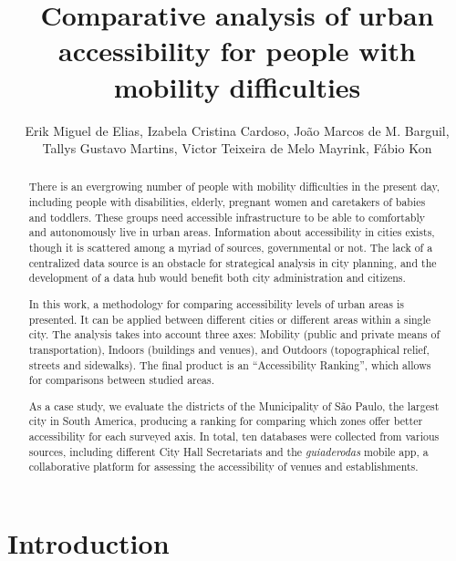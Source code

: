 \documentclass[12pt]{article}
\title{Comparative analysis of urban accessibility for people with mobility difficulties}
\author{
Erik Miguel de Elias\inst{1},
Izabela Cristina Cardoso\inst{2},
João Marcos de M. Barguil\inst{3},\\
Tallys Gustavo Martins\inst{3},
Victor Teixeira de Melo Mayrink\inst{3},
Fábio Kon\inst{3}
}
\begin{document}
\maketitle


\begin{abstract}
There is an evergrowing number of people with mobility difficulties in the present day, including
people with disabilities, elderly, pregnant women and caretakers of babies and toddlers.
These groups need accessible infrastructure to be able to comfortably and autonomously live in urban areas.
Information about accessibility in cities exists, though it is scattered among a myriad of sources, governmental or not.
The lack of a centralized data source is an obstacle for strategical analysis in city planning,
and the development of a data hub would benefit both city administration and citizens.

In this work, a methodology for comparing accessibility levels of urban areas is presented.
It can be applied between different cities or different areas within a single city.
The analysis takes into account three axes:
Mobility (public and private means of transportation),
Indoors (buildings and venues),
and Outdoors (topographical relief, streets and sidewalks).
The final product is an ``Accessibility Ranking'', which allows for comparisons between studied areas.

As a case study, we evaluate the districts of the Municipality of São Paulo, the largest city in South America,
producing a ranking for comparing which zones offer better accessibility for each surveyed axis.
In total, ten databases were collected from various sources, including different City Hall Secretariats and
the \emph{guiaderodas} mobile app, a collaborative platform for assessing the accessibility of venues and establishments.
\end{abstract}

\section{Introduction}
\label{sec:intro}
\end{document}
